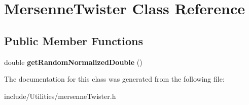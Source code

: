 \hypertarget{class_mersenne_twister}{
\section{MersenneTwister Class Reference}
\label{class_mersenne_twister}
}
\subsection*{Public Member Functions}
\begin{DoxyCompactItemize}
\item 
\hypertarget{class_mersenne_twister_a6b2520445cce27f5de3176703199c8f7}{
double {\bfseries getRandomNormalizedDouble} ()}
\label{class_mersenne_twister_a6b2520445cce27f5de3176703199c8f7}

\end{DoxyCompactItemize}


The documentation for this class was generated from the following file:\begin{DoxyCompactItemize}
\item 
include/Utilities/mersenneTwister.h\end{DoxyCompactItemize}

